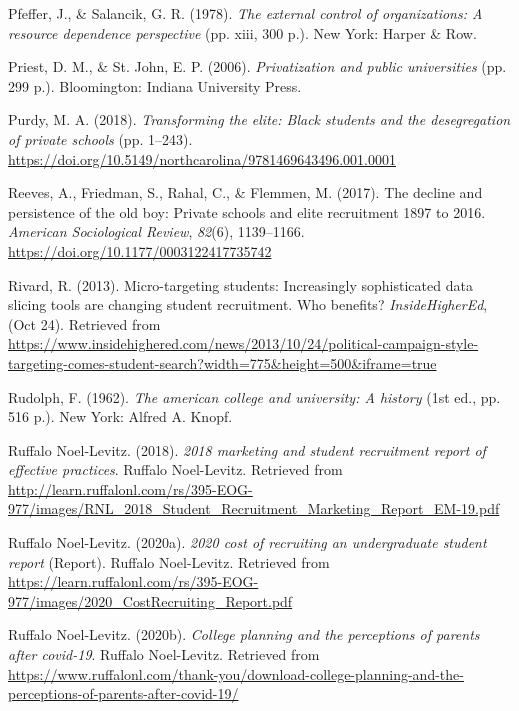 \documentclass[
  12pt,
]{article}
\newlength{\cslhangindent}
\newlength{\cslentryspacingunit} %
\newenvironment{CSLReferences}[2] %
 {%
  \setlength{\parindent}{0pt}
  \ifodd #1
  \let\oldpar\par
  \def\par{\hangindent=\cslhangindent\oldpar}
  \fi
  \setlength{\parskip}{#2\cslentryspacingunit}
 }%
 {}
\begin{document}
\begin{CSLReferences}{1}{0}
\leavevmode{}%
Pfeffer, J., \& Salancik, G. R. (1978). \emph{The external control of organizations: A resource dependence perspective} (pp. xiii, 300 p.). New York: Harper \& Row.

\leavevmode{}%
Priest, D. M., \& St. John, E. P. (2006). \emph{Privatization and public universities} (pp. 299 p.). Bloomington: Indiana University Press.

\leavevmode{}%
Purdy, M. A. (2018). \emph{Transforming the elite: Black students and the desegregation of private schools} (pp. 1--243). \url{https://doi.org/10.5149/northcarolina/9781469643496.001.0001}

\leavevmode{}%
Reeves, A., Friedman, S., Rahal, C., \& Flemmen, M. (2017). The decline and persistence of the old boy: Private schools and elite recruitment 1897 to 2016. \emph{American Sociological Review}, \emph{82}(6), 1139--1166. \url{https://doi.org/10.1177/0003122417735742}

\leavevmode{}%
Rivard, R. (2013). Micro-targeting students: Increasingly sophisticated data slicing tools are changing student recruitment. Who benefits? \emph{InsideHigherEd}, (Oct 24). Retrieved from \url{https://www.insidehighered.com/news/2013/10/24/political-campaign-style-targeting-comes-student-search?width=775\&height=500\&iframe=true}

\leavevmode{}%
Rudolph, F. (1962). \emph{The american college and university: A history} (1st ed., pp. 516 p.). New York: Alfred A. Knopf.

\leavevmode{}%
Ruffalo Noel-Levitz. (2018). \emph{2018 marketing and student recruitment report of effective practices}. Ruffalo Noel-Levitz. Retrieved from \url{http://learn.ruffalonl.com/rs/395-EOG-977/images/RNL_2018_Student_Recruitment_Marketing_Report_EM-19.pdf}

\leavevmode{}%
Ruffalo Noel-Levitz. (2020a). \emph{2020 cost of recruiting an undergraduate student report} (Report). Ruffalo Noel-Levitz. Retrieved from \url{https://learn.ruffalonl.com/rs/395-EOG-977/images/2020_CostRecruiting_Report.pdf}

\leavevmode{}%
Ruffalo Noel-Levitz. (2020b). \emph{College planning and the perceptions of parents after covid-19}. Ruffalo Noel-Levitz. Retrieved from \url{https://www.ruffalonl.com/thank-you/download-college-planning-and-the-perceptions-of-parents-after-covid-19/}


\end{CSLReferences}
\end{document}
